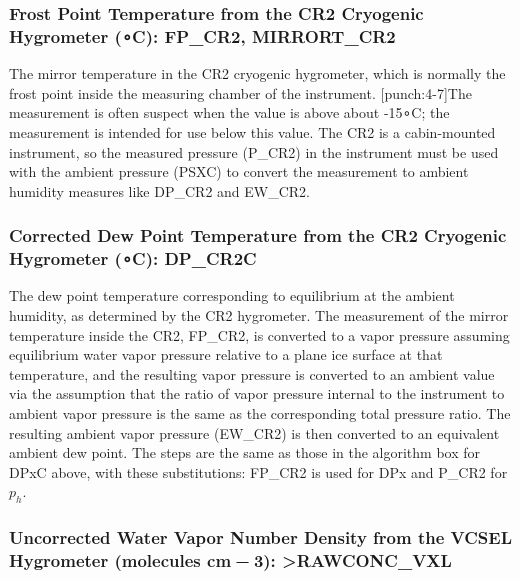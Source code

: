 \documentclass[
  english,
]{book}
\begin{document}
\hypertarget{mirror-cr2}{%
\subsubsection*{\texorpdfstring{Frost Point Temperature from the CR2 Cryogenic Hygrometer ({∘}C): FP\_CR2, MIRRORT\_CR2}{Frost Point Temperature from the CR2 Cryogenic Hygrometer (∘C): FP\_CR2, MIRRORT\_CR2}}\label{mirror-cr2}}

The mirror temperature in the CR2 cryogenic hygrometer, which is normally the frost point inside the measuring chamber of the instrument. \protect\hypertarget{punch:4-7}{}{{[}punch:4-7{]}}The measurement is often suspect when the value is above about -15{∘}C; the measurement is intended for use below this value. The CR2 is a cabin-mounted instrument, so the measured pressure (P\_CR2) in the instrument must be used with the ambient pressure (PSXC) to convert the measurement to ambient humidity measures like DP\_CR2 and EW\_CR2.

\hypertarget{dp-cr2}{%
\subsubsection*{\texorpdfstring{Corrected Dew Point Temperature from the CR2 Cryogenic Hygrometer ({∘}C): DP\_CR2C}{Corrected Dew Point Temperature from the CR2 Cryogenic Hygrometer (∘C): DP\_CR2C}}\label{dp-cr2}}

The dew point temperature corresponding to equilibrium at the ambient humidity, as determined by the CR2 hygrometer. The measurement of the mirror temperature inside the CR2, FP\_CR2, is converted to a vapor pressure assuming equilibrium water vapor pressure relative to a plane ice surface at that temperature, and the resulting vapor pressure is converted to an ambient value via the assumption that the ratio of vapor pressure internal to the instrument to ambient vapor pressure is the same as the corresponding total pressure ratio. The resulting ambient vapor pressure (EW\_CR2) is then converted to an equivalent ambient dew point. The steps are the same as those in the algorithm box for DPxC above, with these substitutions: FP\_CR2 is used for DPx and P\_CR2 for \(p_h\).

\hypertarget{vcsel-uncor}{%
\subsubsection*{\texorpdfstring{Uncorrected Water Vapor Number Density from the VCSEL Hygrometer (molecules cm{ − 3}): \textgreater RAWCONC\_VXL}{Uncorrected Water Vapor Number Density from the VCSEL Hygrometer (molecules cm − 3): \textgreater RAWCONC\_VXL}}\label{vcsel-uncor}}
\end{document}
